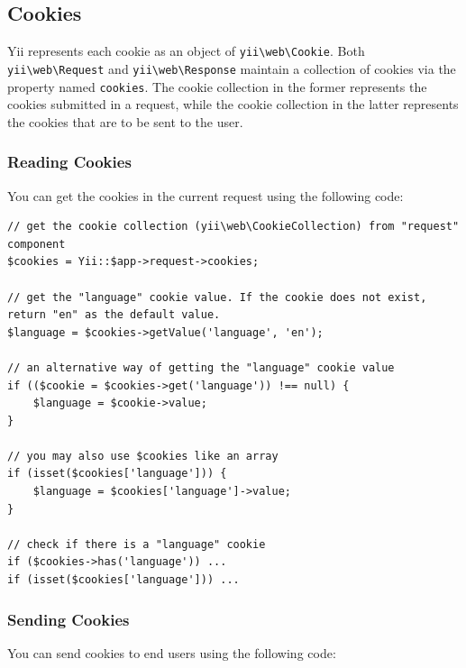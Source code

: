 \subsection{Cookies \label{runtime-sessions-cookies.md::cookies}}
Yii represents each cookie as an object of \texttt{yii{\allowbreak{}\textbackslash}web{\allowbreak{}\textbackslash}Cookie}. Both \texttt{yii{\allowbreak{}\textbackslash}web{\allowbreak{}\textbackslash}Request} and \texttt{yii{\allowbreak{}\textbackslash}web{\allowbreak{}\textbackslash}Response}
maintain a collection of cookies via the property named \lstinline|cookies|. The cookie collection in the former represents
the cookies submitted in a request, while the cookie collection in the latter represents the cookies that are to
be sent to the user.

\subsubsection{Reading Cookies \label{runtime-sessions-cookies.md::reading-cookies}}
You can get the cookies in the current request using the following code:

\lstset{language=php}\begin{lstlisting}
// get the cookie collection (yii\web\CookieCollection) from "request" component
$cookies = Yii::$app->request->cookies;

// get the "language" cookie value. If the cookie does not exist, return "en" as the default value.
$language = $cookies->getValue('language', 'en');

// an alternative way of getting the "language" cookie value
if (($cookie = $cookies->get('language')) !== null) {
    $language = $cookie->value;
}

// you may also use $cookies like an array
if (isset($cookies['language'])) {
    $language = $cookies['language']->value;
}

// check if there is a "language" cookie
if ($cookies->has('language')) ...
if (isset($cookies['language'])) ...
\end{lstlisting}
\subsubsection{Sending Cookies \label{runtime-sessions-cookies.md::sending-cookies}}
You can send cookies to end users using the following code:

